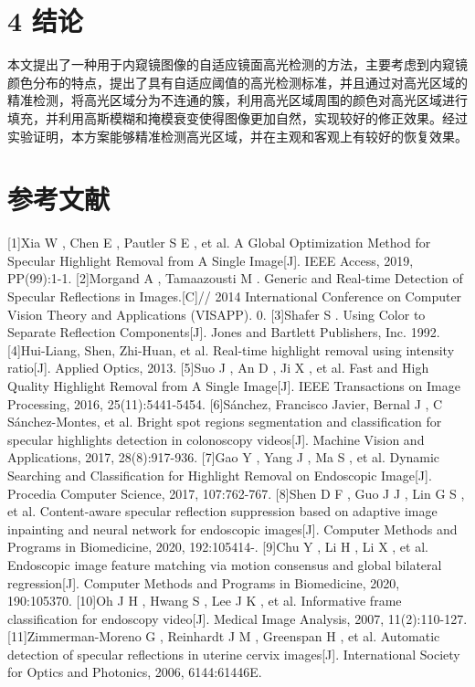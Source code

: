 \documentclass[UTF8,a4paper,12pt]{ctexart}
\begin{document}
\section{4  结论}
本文提出了一种用于内窥镜图像的自适应镜面高光检测的方法，主要考虑到内窥镜颜色分布的特点，提出了具有自适应阈值的高光检测标准，并且通过对高光区域的精准检测，将高光区域分为不连通的簇，利用高光区域周围的颜色对高光区域进行填充，并利用高斯模糊和掩模衰变使得图像更加自然，实现较好的修正效果。经过实验证明，本方案能够精准检测高光区域，并在主观和客观上有较好的恢复效果。

 \section{参考文献}
[1]Xia W ,  Chen E ,  Pautler S E , et al. A Global Optimization Method for Specular Highlight Removal from A Single Image[J]. IEEE Access, 2019, PP(99):1-1.
[2]Morgand A ,  Tamaazousti M . Generic and Real-time Detection of Specular Reflections in Images.[C]// 2014 International Conference on Computer Vision Theory and Applications (VISAPP). 0.
[3]Shafer S . Using Color to Separate Reflection Components[J]. Jones and Bartlett Publishers, Inc.  1992.
[4]Hui-Liang, Shen, Zhi-Huan, et al. Real-time highlight removal using intensity ratio[J]. Applied Optics, 2013.
[5]Suo J ,  An D ,  Ji X , et al. Fast and High Quality Highlight Removal from A Single Image[J]. IEEE Transactions on Image Processing, 2016, 25(11):5441-5454.
[6]Sánchez, Francisco Javier,  Bernal J , C Sánchez-Montes, et al. Bright spot regions segmentation and classification for specular highlights detection in colonoscopy videos[J]. Machine Vision and Applications, 2017, 28(8):917-936.
[7]Gao Y ,  Yang J ,  Ma S , et al. Dynamic Searching and Classification for Highlight Removal on Endoscopic Image[J]. Procedia Computer Science, 2017, 107:762-767.
[8]Shen D F ,  Guo J J ,  Lin G S , et al. Content-aware specular reflection suppression based on adaptive image inpainting and neural network for endoscopic images[J]. Computer Methods and Programs in Biomedicine, 2020, 192:105414-.
[9]Chu Y ,  Li H ,  Li X , et al. Endoscopic image feature matching via motion consensus and global bilateral regression[J]. Computer Methods and Programs in Biomedicine, 2020, 190:105370.
[10]Oh J H ,  Hwang S ,  Lee J K , et al. Informative frame classification for endoscopy video[J]. Medical Image Analysis, 2007, 11(2):110-127.
[11]Zimmerman-Moreno G ,  Reinhardt J M ,  Greenspan H , et al. Automatic detection of specular reflections in uterine cervix images[J]. International Society for Optics and Photonics, 2006, 6144:61446E.
\end{document}
